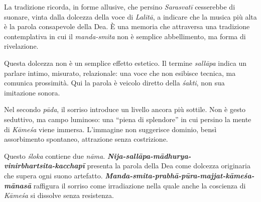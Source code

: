 La tradizione ricorda, in forme allusive, che persino \textit{Sarasvatī} cesserebbe di suonare, vinta dalla dolcezza della voce di \textit{Lalitā}, a indicare che la musica più alta è la parola consapevole della Dea. È una memoria che attraversa una tradizione contemplativa in cui il \textit{manda-smita} non è semplice abbellimento, ma forma di rivelazione.

Questa dolcezza non è un semplice effetto estetico. Il termine \textit{sallāpa} indica un parlare intimo, misurato, relazionale: una voce che non esibisce tecnica, ma comunica prossimità. Qui la parola è veicolo diretto della \textit{śakti}, non sua imitazione sonora.

Nel secondo \textit{pāda}, il sorriso introduce un livello ancora più sottile. Non è gesto seduttivo, ma campo luminoso: una “piena di splendore” in cui persino la mente di \textit{Kāmeśa} viene immersa. L’immagine non suggerisce dominio, bensì assorbimento spontaneo, attrazione senza costrizione.

Questo \textit{śloka} contiene due \textit{nāma}.  
\textbf{\textit{Nija-sallāpa-mādhurya-\\vinirbhartsita-kacchapī}} presenta la parola della Dea come dolcezza originaria che supera ogni suono artefatto.  
\textbf{\textit{Manda-smita-prabhā-pūra-majjat-kāmeśa-mānasā}} raffigura il sorriso come irradiazione nella quale anche la coscienza di \textit{Kāmeśa} si dissolve senza resistenza.

